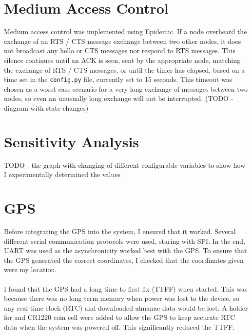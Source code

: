 \documentclass[12pt,a4paper]{report}
\begin{document}
\section{Medium Access Control}
Medium access control was implemented using Epidemic. If a node overheard the exchange of an RTS / CTS message exchange between two other nodes, it does not broadcast any hello or CTS messages nor respond to RTS messages. This silence continues until an ACK is seen, sent by the appropriate node, matching the exchange of RTS / CTS messages, or until the timer has elapsed, based on a time set in the \verb'config.py' file, currently set to 15 seconds. This timeout was chosen as a worst case scenario for a very long exchange of messages between two nodes, so even an unusually long exchange will not be interrupted. 
(TODO - diagram with state changes)

\section{Sensitivity Analysis}
TODO - the graph with changing of different configurable variables to show how I experimentally determined the values

\section{GPS} 
Before integrating the GPS into the system, I ensured that it worked. Several different serial communication protocols were used, staring with SPI. In the end, UART was used as the asynchronicity worked best with the GPS. To ensure that the GPS generated the correct coordinates, I checked that the coordinates given were my location. \\ \\ 
I found that the GPS had a long time to first fix (TTFF) when started. This was because there was no long term memory when power was lost to the device, so any real time clock (RTC) and downloaded almanac data would be lost. A holder for and CR1220 coin cell were added to allow the GPS to keep accurate RTC data when the system was powered off. This significantly reduced the TTFF. 
\end{document}
